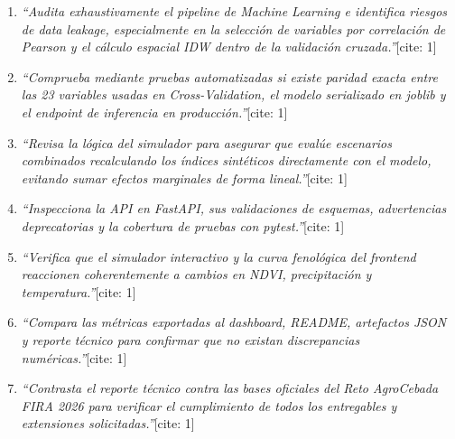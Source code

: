 \documentclass[11pt,a4paper]{article}
\begin{document}
\begin{tcolorbox}[enhanced, colback=surfacebg, colframe=borderline, boxrule=0.7pt, arc=3pt, title={\sffamily\bfseries\footnotesize Prompts Representativos Utilizados durante el Desarrollo (Requisito Oficial)}, colbacktitle=forestdeep, coltitle=white, top=6pt, bottom=6pt]
\scriptsize
\begin{enumerate}[label=\textbf{\sffamily\color{amberwarm!90!black}Prompt \arabic*:}, leftmargin=1.9cm, itemsep=2.5pt]
  \item \textit{``Audita exhaustivamente el pipeline de Machine Learning e identifica riesgos de data leakage, especialmente en la selección de variables por correlación de Pearson y el cálculo espacial IDW dentro de la validación cruzada.''}[cite: 1]
  \item \textit{``Comprueba mediante pruebas automatizadas si existe paridad exacta entre las 23 variables usadas en Cross-Validation, el modelo serializado en joblib y el endpoint de inferencia en producción.''}[cite: 1]
  \item \textit{``Revisa la lógica del simulador para asegurar que evalúe escenarios combinados recalculando los índices sintéticos directamente con el modelo, evitando sumar efectos marginales de forma lineal.''}[cite: 1]
  \item \textit{``Inspecciona la API en FastAPI, sus validaciones de esquemas, advertencias deprecatorias y la cobertura de pruebas con pytest.''}[cite: 1]
  \item \textit{``Verifica que el simulador interactivo y la curva fenológica del frontend reaccionen coherentemente a cambios en NDVI, precipitación y temperatura.''}[cite: 1]
  \item \textit{``Compara las métricas exportadas al dashboard, README, artefactos JSON y reporte técnico para confirmar que no existan discrepancias numéricas.''}[cite: 1]
  \item \textit{``Contrasta el reporte técnico contra las bases oficiales del Reto AgroCebada FIRA 2026 para verificar el cumplimiento de todos los entregables y extensiones solicitadas.''}[cite: 1]
\end{enumerate}
\end{tcolorbox}
\end{document}
